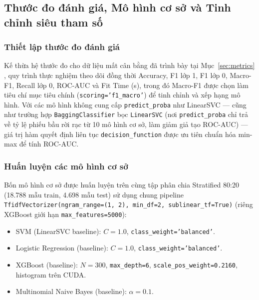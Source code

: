 \subsection{Thước đo đánh giá, Mô hình cơ sở và Tinh chỉnh siêu tham số}

\subsubsection{Thiết lập thước đo đánh giá}
Kế thừa hệ thước đo cho dữ liệu mất cân bằng đã trình bày tại Mục~\ref{sec:metrics} \cite{he2009}, quy trình thực nghiệm theo dõi đồng thời Accuracy, F1 lớp 1, F1 lớp 0, Macro-F1, Recall lớp 0, ROC-AUC và Fit Time (s), trong đó Macro-F1 được chọn làm tiêu chí mục tiêu chính (\texttt{scoring='f1\_macro'}) để tinh chỉnh và xếp hạng mô hình. Với các mô hình không cung cấp \texttt{predict\_proba} như LinearSVC — cũng như trường hợp \texttt{BaggingClassifier} bọc \texttt{LinearSVC} (nơi \texttt{predict\_proba} chỉ trả về tỷ lệ phiếu bầu rời rạc từ 10 mô hình cơ sở, làm giảm giả tạo ROC-AUC) — giá trị hàm quyết định liên tục \texttt{decision\_function} được ưu tiên chuẩn hóa min-max để tính ROC-AUC.

\subsubsection{Huấn luyện các mô hình cơ sở}
Bốn mô hình cơ sở được huấn luyện trên cùng tập phân chia Stratified 80:20 (18.788 mẫu train, 4.698 mẫu test) sử dụng chung pipeline \texttt{TfidfVectorizer(ngram\_range=(1, 2), min\_df=2, sublinear\_tf=True)} (riêng XGBoost giới hạn \texttt{max\_features=5000}):
\begin{itemize}
    \item SVM (LinearSVC baseline): $C=1.0$, \texttt{class\_weight='balanced'}.
    \item Logistic Regression (baseline): $C=1.0$, \texttt{class\_weight='balanced'}.
    \item XGBoost (baseline): $N=300$, \texttt{max\_depth=6}, \texttt{scale\_pos\_weight=0.2160}, histogram trên CUDA.
    \item Multinomial Naive Bayes (baseline): $\alpha=0.1$.
\end{itemize}

